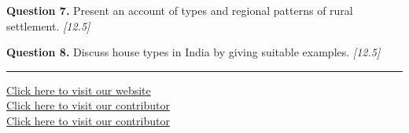 \documentclass[11pt,a4paper]{article}
\newcommand{\pts}[1]{\hfill   \textit{[#1]}}
\begin{document}
\medskip


\noindent   \textbf{Question 7.} Present an account of types and regional patterns of rural settlement. \pts{12.5}

\medskip


\noindent   \textbf{Question 8.} Discuss house types in India by giving suitable examples. \pts{12.5}

\vfill\rule{\linewidth}{0.4pt}

\begin{center}\small
\href{https://bhu-exam.vercel.app/}{Click here to visit our website}\\[4pt]
\href{https://me-aryan.vercel.app/}{Click here to visit our contributor}\\[4pt]
\href{https://quashan-me.vercel.app/}{Click here to visit our contributor}
\end{center}
\end{document}
